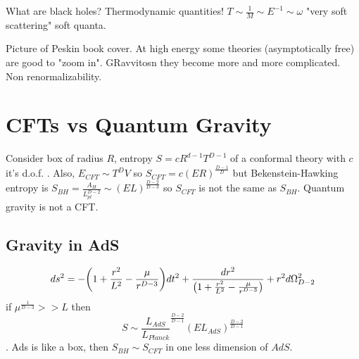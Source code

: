 \documentclass[10pt,
 article,
 amsmath,amssymb
]{revtex4-2}
\begin{document}
What are black holes? Thermodynamic quantities! $T\sim \frac{1}{M} \sim E^{-1} \sim \omega$ "very soft scattering" soft quanta.

Picture of Peskin book cover. At high energy some theories (asymptotically free) are good to "zoom in". GRavvitosn they become more and more complicated. Non renormalizability.


\section{CFTs vs Quantum Gravity}
Consider box of radius $R$, entropy $S= c R^{d-1} T^{D-1}$ of a conformal theory with $c$ it's d.o.f. . Also, $E_{CFT} \sim T^{D} V$ so $S_{CFT}=c (ER)^{\frac{D-1}{D}}$
but Bekenstein-Hawking entropy is $S_{BH}= \frac{A_{H}}{L_{pl}^{D-2}} \sim (E L)^{\frac{D-2}{D-3}}$
 so $S_{CFT}$ is not the same as $S_{BH}$. Quantum gravity is not a CFT.

 \subsection{Gravity in AdS}
 \begin{equation}
    ds^2=-\qty(1+ \frac{r^2}{L^2} - \frac{\mu}{r^{D-3}}) dt^2 + \frac{dr^2}{\qty(1+ \frac{r^2}{L^2} - \frac{\mu}{r^{D-3}})} +r^2 d\Omega_{D-2}^2
 \end{equation}
 if $\mu^{\frac{1}{D-3}} >> L$ then $$S\sim \frac{L_{AdS}}{L_{Planck}}^{\frac{D-2}{D-1}} (EL_{AdS})^{\frac{D-2}{D-1}}$$. Ads is like a box, then $S_{BH} \sim S_{CFT}$ in one less dimension of $AdS$.
\end{document}
